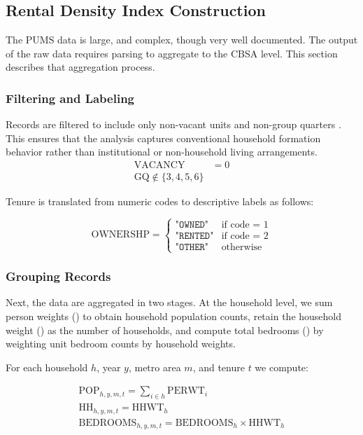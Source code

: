 \documentclass[pdflatex,sn-apa]{sn-jnl}%
\theoremstyle{thmstyleone}%
\theoremstyle{thmstyletwo}%
\theoremstyle{thmstylethree}%
\begin{document}
\subsection{Rental Density Index Construction}
The PUMS data is large, and complex, though very well documented. The output of the raw data requires parsing to aggregate to the CBSA level. This section describes that aggregation process.
\subsubsection{Filtering and Labeling}
Records are filtered to include only non-vacant units and non-group quarters . This ensures that the analysis captures conventional household formation behavior rather than institutional or non-household living arrangements.
\begin{align}
	\text{VACANCY} &= 0 \\
	\text{GQ} \notin \{3,4,5,6\}
\end{align}

Tenure is translated from numeric codes to descriptive labels as follows:

\begin{equation}
	\text{OWNERSHP} =
	\begin{cases}
		\texttt{"OWNED"} & \text{if code = 1} \\
		\texttt{"RENTED"} & \text{if code = 2} \\
		\texttt{"OTHER"} & \text{otherwise}
	\end{cases}
\end{equation}

\subsubsection{Grouping Records}
Next, the data are aggregated in two stages. At the household level, we sum person weights () to obtain household population counts, retain the household weight () as the number of households, and compute total bedrooms () by weighting unit bedroom counts by household weights. 

For each household \( h \), year \( y \), metro area \( m\), and tenure \(t\) we compute:

\begin{align}
	\text{POP}_{h,y,m,t} = \sum_{i \in h} \text{PERWT}_{i} \\
	\text{HH}_{h,y,m,t} = \text{HHWT}_{h} \\
	\text{BEDROOMS}_{h,y,m,t} = \text{BEDROOMS}_{h} \times \text{HHWT}_{h} 
\end{align}
\end{document}
